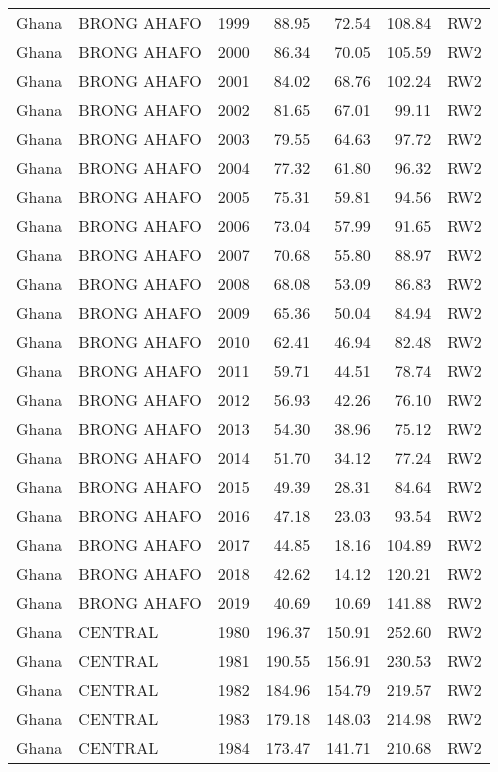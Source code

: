 \begin{longtable}{lllrrrl}
  Ghana & BRONG AHAFO & 1999 & 88.95 & 72.54 & 108.84 & RW2 \\ 
  Ghana & BRONG AHAFO & 2000 & 86.34 & 70.05 & 105.59 & RW2 \\ 
  Ghana & BRONG AHAFO & 2001 & 84.02 & 68.76 & 102.24 & RW2 \\ 
  Ghana & BRONG AHAFO & 2002 & 81.65 & 67.01 & 99.11 & RW2 \\ 
  Ghana & BRONG AHAFO & 2003 & 79.55 & 64.63 & 97.72 & RW2 \\ 
  Ghana & BRONG AHAFO & 2004 & 77.32 & 61.80 & 96.32 & RW2 \\ 
  Ghana & BRONG AHAFO & 2005 & 75.31 & 59.81 & 94.56 & RW2 \\ 
  Ghana & BRONG AHAFO & 2006 & 73.04 & 57.99 & 91.65 & RW2 \\ 
  Ghana & BRONG AHAFO & 2007 & 70.68 & 55.80 & 88.97 & RW2 \\ 
  Ghana & BRONG AHAFO & 2008 & 68.08 & 53.09 & 86.83 & RW2 \\ 
  Ghana & BRONG AHAFO & 2009 & 65.36 & 50.04 & 84.94 & RW2 \\ 
  Ghana & BRONG AHAFO & 2010 & 62.41 & 46.94 & 82.48 & RW2 \\ 
  Ghana & BRONG AHAFO & 2011 & 59.71 & 44.51 & 78.74 & RW2 \\ 
  Ghana & BRONG AHAFO & 2012 & 56.93 & 42.26 & 76.10 & RW2 \\ 
  Ghana & BRONG AHAFO & 2013 & 54.30 & 38.96 & 75.12 & RW2 \\ 
  Ghana & BRONG AHAFO & 2014 & 51.70 & 34.12 & 77.24 & RW2 \\ 
  Ghana & BRONG AHAFO & 2015 & 49.39 & 28.31 & 84.64 & RW2 \\ 
  Ghana & BRONG AHAFO & 2016 & 47.18 & 23.03 & 93.54 & RW2 \\ 
  Ghana & BRONG AHAFO & 2017 & 44.85 & 18.16 & 104.89 & RW2 \\ 
  Ghana & BRONG AHAFO & 2018 & 42.62 & 14.12 & 120.21 & RW2 \\ 
  Ghana & BRONG AHAFO & 2019 & 40.69 & 10.69 & 141.88 & RW2 \\ 
  Ghana & CENTRAL & 1980 & 196.37 & 150.91 & 252.60 & RW2 \\ 
  Ghana & CENTRAL & 1981 & 190.55 & 156.91 & 230.53 & RW2 \\ 
  Ghana & CENTRAL & 1982 & 184.96 & 154.79 & 219.57 & RW2 \\ 
  Ghana & CENTRAL & 1983 & 179.18 & 148.03 & 214.98 & RW2 \\ 
  Ghana & CENTRAL & 1984 & 173.47 & 141.71 & 210.68 & RW2 \\ 

\end{longtable}
